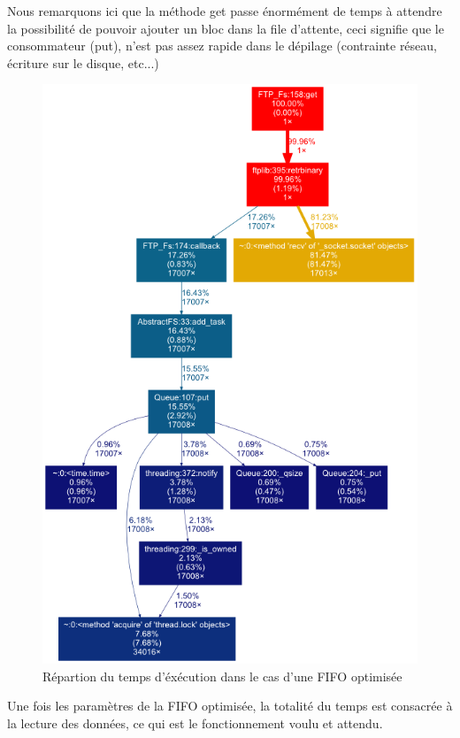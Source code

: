 Nous remarquons ici que la méthode get passe énormément de temps à attendre la possibilité de pouvoir ajouter un bloc dans la file d'attente, ceci signifie que le consommateur (put), n'est pas assez rapide dans le dépilage (contrainte réseau, écriture sur le disque, etc...)

\begin{figure}[h!]
	\centering
	\includegraphics{images/with_optimization}
	\caption{Répartion du temps d'éxécution dans le cas d'une FIFO optimisée}
\end{figure}

Une fois les paramètres de la FIFO optimisée, la totalité du temps est consacrée à la lecture des données, ce qui est le fonctionnement voulu et attendu.